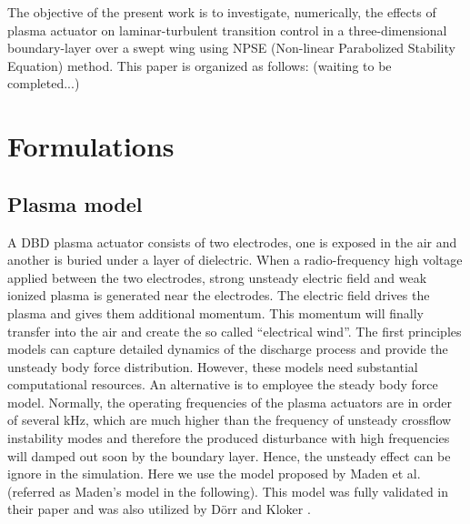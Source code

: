 \documentclass{AIAA}
\begin{document}
The objective of the present work is to investigate, numerically, the effects of plasma actuator on laminar-turbulent transition control in a three-dimensional boundary-layer over a swept wing using NPSE (Non-linear Parabolized Stability Equation) method. This paper is organized as follows: {\color{red}(waiting to be completed...)}


\section{Formulations}\label{sec:formulation}
\subsection{Plasma model}

A DBD plasma actuator consists of two electrodes, one is exposed in the air and another is buried under a layer of dielectric. When a radio-frequency high voltage applied between the two electrodes, strong unsteady electric field and weak ionized plasma is generated near the electrodes. The electric field drives the plasma and gives them additional momentum. This momentum will finally transfer into the air and create the so called ``electrical wind''. The first principles models\cite{Likhanskii2008,Boeuf2007,Jayaramen2008} can capture detailed dynamics of the discharge process and provide the unsteady body force distribution. However, these models need substantial computational resources. An alternative is to employee the steady body force model. Normally, the operating frequencies of the plasma actuators are in order of several kHz, which are much higher than the frequency of unsteady crossflow instability modes and therefore the produced disturbance with high frequencies will damped out soon by the boundary layer\cite{dorr2015stabilisation}. Hence, the unsteady effect can be ignore in the simulation. Here we use the model proposed by Maden et al.\cite{Maden2013}(referred as Maden's model in the following). This model was fully validated in their paper and was also utilized by D\"orr and Kloker \cite{dorr2015stabilisation,dorr2016}.
\end{document}
